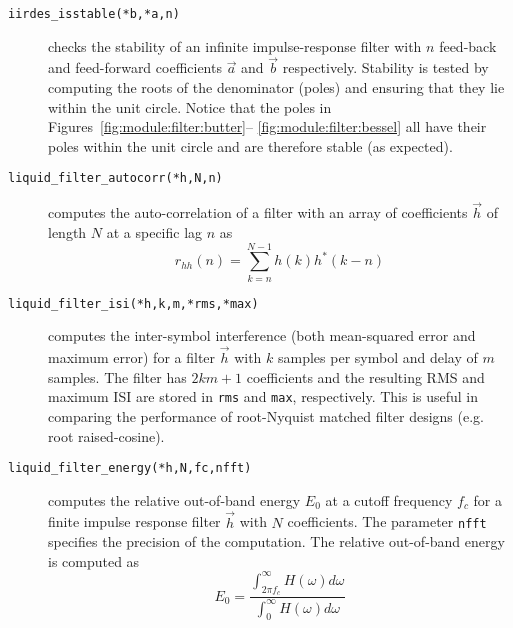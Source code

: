 \begin{description}
\item[{\tt iirdes\_isstable(*b,*a,n)}]
    checks the stability of an infinite impulse-response filter with $n$
    feed-back and feed-forward coefficients $\vec{a}$ and $\vec{b}$
    respectively.
    Stability is tested by computing the roots of the denominator
    (poles) and ensuring that they lie within the unit circle.
    Notice that the poles in
    Figures~\ref{fig:module:filter:butter}--%
           \ref{fig:module:filter:bessel}
    all have their poles within the unit circle and are therefore stable
    (as expected).

\item[{\tt liquid\_filter\_autocorr(*h,N,n)}]
    computes the auto-correlation of a filter with an array of
    coefficients $\vec{h}$ of length $N$ at a specific lag $n$ as
    \begin{equation}
    \label{eqn:filter:firdes:misc:autocorr}
        r_{hh}(n) = \sum_{k=n}^{N-1} {h(k)h^*(k-n)}
    \end{equation}

\item[{\tt liquid\_filter\_isi(*h,k,m,*rms,*max)}]
    computes the inter-symbol interference 
    (both mean-squared error and maximum error)
    for a filter $\vec{h}$ with $k$ samples per symbol and delay of $m$
    samples.
    The filter has $2km+1$ coefficients and the resulting
    RMS and maximum ISI are stored in {\tt rms} and {\tt max},
    respectively.
    This is useful in comparing the performance of root-Nyquist matched
    filter designs (e.g. root raised-cosine).

\item[{\tt liquid\_filter\_energy(*h,N,fc,nfft)}]
    computes the relative out-of-band energy $E_0$ at a cutoff frequency
    $f_c$ for a finite impulse response filter $\vec{h}$ with $N$
    coefficients.
    The parameter {\tt nfft} specifies the precision of the computation.
    The relative out-of-band energy is computed as
    \begin{equation}
    \label{eqn:filter:firdes:misc:filter_energy}
        E_0 =
            \frac{
                \int_{2 \pi f_c}^{\infty}{H(\omega)d\omega}
            } {
                \int_{0}^{\infty}{H(\omega)d\omega}
            }
    \end{equation}

\end{description}



